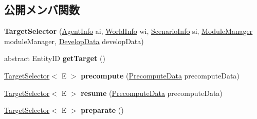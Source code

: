 \subsection*{公開メンバ関数}
\begin{DoxyCompactItemize}
\item 
\hypertarget{classadf_1_1component_1_1module_1_1complex_1_1TargetSelector_a1723a710769dd4d72d597efc4d82aa06}{}\label{classadf_1_1component_1_1module_1_1complex_1_1TargetSelector_a1723a710769dd4d72d597efc4d82aa06} 
{\bfseries Target\+Selector} (\hyperlink{classadf_1_1agent_1_1info_1_1AgentInfo}{Agent\+Info} ai, \hyperlink{classadf_1_1agent_1_1info_1_1WorldInfo}{World\+Info} wi, \hyperlink{classadf_1_1agent_1_1info_1_1ScenarioInfo}{Scenario\+Info} si, \hyperlink{classadf_1_1agent_1_1module_1_1ModuleManager}{Module\+Manager} module\+Manager, \hyperlink{classadf_1_1agent_1_1develop_1_1DevelopData}{Develop\+Data} develop\+Data)
\item 
\hypertarget{classadf_1_1component_1_1module_1_1complex_1_1TargetSelector_a5dfc0499efad06d0d493ec73762fd5ee}{}\label{classadf_1_1component_1_1module_1_1complex_1_1TargetSelector_a5dfc0499efad06d0d493ec73762fd5ee} 
abstract Entity\+ID {\bfseries get\+Target} ()
\item 
\hypertarget{classadf_1_1component_1_1module_1_1complex_1_1TargetSelector_a501467964b79b07f6f3a66f1f14aecbd}{}\label{classadf_1_1component_1_1module_1_1complex_1_1TargetSelector_a501467964b79b07f6f3a66f1f14aecbd} 
\hyperlink{classadf_1_1component_1_1module_1_1complex_1_1TargetSelector}{Target\+Selector}$<$ E $>$ {\bfseries precompute} (\hyperlink{classadf_1_1agent_1_1precompute_1_1PrecomputeData}{Precompute\+Data} precompute\+Data)
\item 
\hypertarget{classadf_1_1component_1_1module_1_1complex_1_1TargetSelector_a74ab67b1d75088c5353c33c3040f02ec}{}\label{classadf_1_1component_1_1module_1_1complex_1_1TargetSelector_a74ab67b1d75088c5353c33c3040f02ec} 
\hyperlink{classadf_1_1component_1_1module_1_1complex_1_1TargetSelector}{Target\+Selector}$<$ E $>$ {\bfseries resume} (\hyperlink{classadf_1_1agent_1_1precompute_1_1PrecomputeData}{Precompute\+Data} precompute\+Data)
\item 
\hypertarget{classadf_1_1component_1_1module_1_1complex_1_1TargetSelector_aeb8e0c96975e745ca571bc0d2b98c631}{}\label{classadf_1_1component_1_1module_1_1complex_1_1TargetSelector_aeb8e0c96975e745ca571bc0d2b98c631} 
\hyperlink{classadf_1_1component_1_1module_1_1complex_1_1TargetSelector}{Target\+Selector}$<$ E $>$ {\bfseries preparate} ()
\item 

\end{DoxyCompactItemize}
